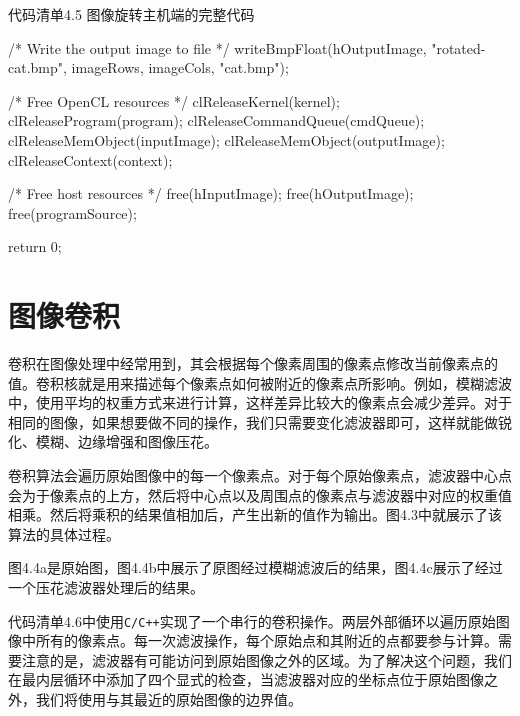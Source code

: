 \begin{codeboxt}[cpp]{代码清单4.5 图像旋转主机端的完整代码}
{  /* Write the output image to file */
  writeBmpFloat(hOutputImage, "rotated-cat.bmp", imageRows, imageCols, "cat.bmp");

  /* Free OpenCL resources */
  clReleaseKernel(kernel);
  clReleaseProgram(program);
  clReleaseCommandQueue(cmdQueue);
  clReleaseMemObject(inputImage);
  clReleaseMemObject(outputImage);
  clReleaseContext(context);

  /* Free host resources */
  free(hInputImage);
  free(hOutputImage);
  free(programSource);

  return 0;
}
\end{codeboxt}



\section{图像卷积}

卷积在图像处理中经常用到，其会根据每个像素周围的像素点修改当前像素点的值。卷积核就是用来描述每个像素点如何被附近的像素点所影响。例如，模糊滤波中，使用平均的权重方式来进行计算，这样差异比较大的像素点会减少差异。对于相同的图像，如果想要做不同的操作，我们只需要变化滤波器即可，这样就能做锐化、模糊、边缘增强和图像压花。

卷积算法会遍历原始图像中的每一个像素点。对于每个原始像素点，滤波器中心点会为于像素点的上方，然后将中心点以及周围点的像素点与滤波器中对应的权重值相乘。然后将乘积的结果值相加后，产生出新的值作为输出。图4.3中就展示了该算法的具体过程。


图4.4a是原始图，图4.4b中展示了原图经过模糊滤波后的结果，图4.4c展示了经过一个压花滤波器处理后的结果。


代码清单4.6中使用\texttt{C/C++}实现了一个串行的卷积操作。两层外部循环以遍历原始图像中所有的像素点。每一次滤波操作，每个原始点和其附近的点都要参与计算。需要注意的是，滤波器有可能访问到原始图像之外的区域。为了解决这个问题，我们在最内层循环中添加了四个显式的检查，当滤波器对应的坐标点位于原始图像之外，我们将使用与其最近的原始图像的边界值。


